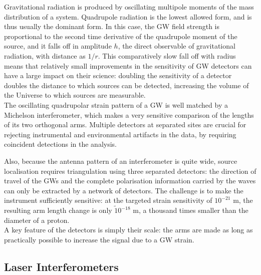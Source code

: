\documentclass[binding=0.6cm, LaM]{sapthesis}
\begin{document}
	Gravitational radiation is produced by oscillating multipole moments of the mass distribution of a system. 
	Quadrupole radiation is the lowest allowed form, and is thus usually the dominant form. 
	In this case, the GW field strength is proportional to the second time derivative of the quadrupole moment of the source, 
	and it falls off in amplitude $h$, the direct observable of gravitational radiation, with distance as $1/r$. 
	This comparatively slow fall off with radius means that relatively small improvements in the sensitivity 
	of GW detectors can have a large impact on their science:
	doubling the sensitivity of a detector doubles the distance to which sources can be detected, 
	increasing the volume of the Universe to which sources are measurable. \\ 
	The oscillating quadrupolar strain pattern of a GW is well matched by a Michelson interferometer, 
	which makes a very sensitive comparison of the lengths of its two orthogonal arms. 
	Multiple detectors at separated sites are crucial for rejecting instrumental and environmental artifacts in the data, 
	by requiring coincident detections in the analysis. 


	Also, because the antenna pattern of an interferometer is quite wide, 
	source localisation requires triangulation using three separated detectors: 
	the direction of travel of the GWs and the complete polarisation information carried by the waves can only be extracted by a network of detectors. 
	The challenge is to make the instrument sufficiently sensitive: 
	at the targeted strain sensitivity of $10^{−21}$ m, the resulting arm length change is only $\tilde 10^{-18}$ m, 
	a thousand times smaller than the diameter of a proton. \\
	A key feature of the detectors is simply their scale: 
	the arms are made as long as practically possible to increase the signal due to a GW strain. 

\subsection{Laser Interferometers}
\end{document}
